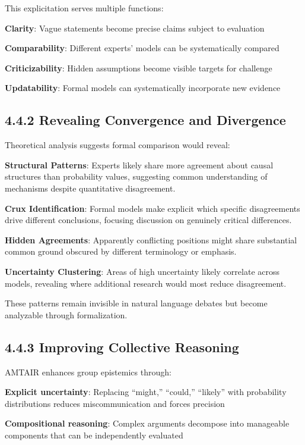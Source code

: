 \documentclass[
  11pt,
  letterpaper,
]{book}
\begin{document}
This explicitation serves multiple functions:

\textbf{Clarity}: Vague statements become precise claims subject to
evaluation

\textbf{Comparability}: Different experts' models can be systematically
compared

\textbf{Criticizability}: Hidden assumptions become visible targets for
challenge

\textbf{Updatability}: Formal models can systematically incorporate new
evidence

\subsection{4.4.2 Revealing Convergence and
Divergence}\label{sec-convergence-divergence}

Theoretical analysis suggests formal comparison would reveal:

\textbf{Structural Patterns}: Experts likely share more agreement about
causal structures than probability values, suggesting common
understanding of mechanisms despite quantitative disagreement.

\textbf{Crux Identification}: Formal models make explicit which specific
disagreements drive different conclusions, focusing discussion on
genuinely critical differences.

\textbf{Hidden Agreements}: Apparently conflicting positions might share
substantial common ground obscured by different terminology or emphasis.

\textbf{Uncertainty Clustering}: Areas of high uncertainty likely
correlate across models, revealing where additional research would most
reduce disagreement.

These patterns remain invisible in natural language debates but become
analyzable through formalization.

\subsection{4.4.3 Improving Collective
Reasoning}\label{sec-collective-reasoning}

AMTAIR enhances group epistemics through:

\textbf{Explicit uncertainty}: Replacing ``might,'' ``could,''
``likely'' with probability distributions reduces miscommunication and
forces precision

\textbf{Compositional reasoning}: Complex arguments decompose into
manageable components that can be independently evaluated
\end{document}
